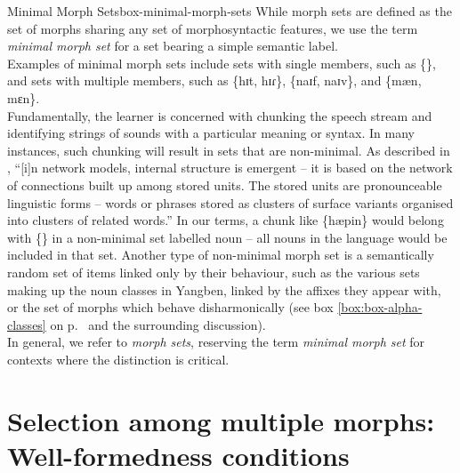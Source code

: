\begin{dadpbox}{Minimal Morph Sets}{box-minimal-morph-sets}
While morph sets are defined as the set of morphs sharing any set of morphosyntactic features, we use the term \textit{minimal morph set} for a set bearing a simple semantic label.\\ 

Examples of minimal morph sets include sets with single members, such as \{\}, and sets with multiple members, such as \{hɪt, hɪɾ\}, \{naɪf, naɪv\}, and \{mæn, mɛn\}.\\

Fundamentally, the learner is concerned with chunking the speech stream and identifying strings of sounds with a particular meaning or syntax.  In many instances, such chunking will result in sets that are non-minimal. As described in \citet{Bybee:1999}, ``[i]n network models, internal structure is emergent -- it is based on the network of connections built up among stored units. The stored units are pronounceable linguistic forms -- words or phrases stored as clusters of surface variants organised into clusters of related words.'' In our terms, a chunk like \{hæpin\@s\} would belong with \{\} in a non-minimal set labelled {\sc noun} -- all nouns in the language would be included in that set. Another type of non-minimal morph set is a semantically random set of items linked only by their behaviour, such as the various sets making up the noun classes in Yangben, linked by the affixes they appear with, or the set of morphs which behave disharmonically (see box \ref{box:box-alpha-classes} on p.\ \pageref{box:box-alpha-classes} and the surrounding discussion).\\

In general, we refer to \textit{morph sets}, reserving the term \textit{minimal morph set} for contexts where the distinction is critical.
\end{dadpbox}


\section{Selection among multiple morphs: Well-formedness conditions}\label{section_choice}

